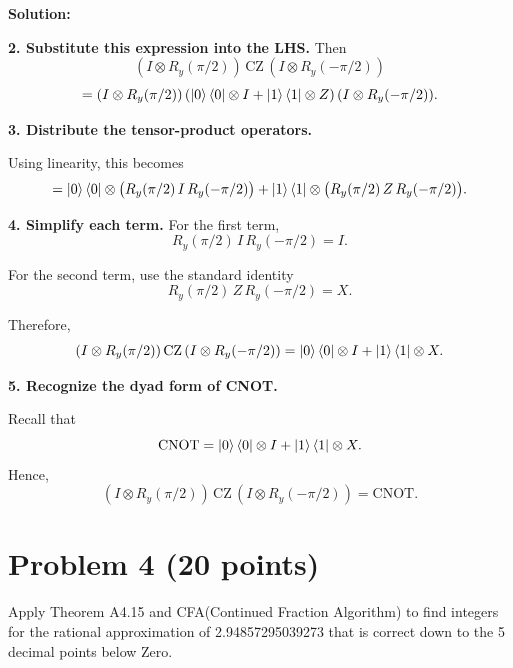 \documentclass[11pt]{article}
\newenvironment{solution}
{\par\noindent\textbf{Solution:}\par}
{\vspace{1em}}
\begin{document}
\begin{solution}
\textbf{2. Substitute this expression into the LHS.}
Then \[(I\otimes R_y(\pi/2))\,\mathrm{CZ}\,(I\otimes R_y(-\pi/2))\]
\[=(I\otimes R_y(\pi/2)) \left(\ket{0}\bra{0}\otimes I + \ket{1}\bra{1}\otimes Z\right)(I\otimes R_y(-\pi/2)).\]

\textbf{3. Distribute the tensor-product operators.}

Using linearity, this becomes
\[= \ket{0}\bra{0}\otimes \bigl(R_y(\pi/2)\,I\,R_y(-\pi/2)\bigr) + \ket{1}\bra{1}\otimes \bigl(R_y(\pi/2)\,Z\,R_y(-\pi/2)\bigr).\]

\textbf{4. Simplify each term.}
For the first term, \[R_y(\pi/2)\,I\,R_y(-\pi/2)=I.\]

For the second term, use the standard identity
\[R_y(\pi/2)\,Z\,R_y(-\pi/2)=X.\]

Therefore,
\[(I\otimes R_y(\pi/2))\,\mathrm{CZ}\,(I\otimes R_y(-\pi/2)) = \ket{0}\bra{0}\otimes I+\ket{1}\bra{1}\otimes X.\]

\textbf{5. Recognize the dyad form of CNOT.}

Recall that
\[\mathrm{CNOT} = \ket{0}\bra{0}\otimes I+\ket{1}\bra{1}\otimes X.\]
Hence,
\[\boxed{(I\otimes R_y(\pi/2))\,\mathrm{CZ}\,(I\otimes R_y(-\pi/2)) = \mathrm{CNOT}}.\]
\end{solution}

\section*{Problem 4 (20 points)}
Apply Theorem A4.15 and CFA(Continued Fraction Algorithm)  to find integers for 
the rational approximation of 2.94857295039273 that is correct down to the 5 
decimal points below Zero.
\end{document}
